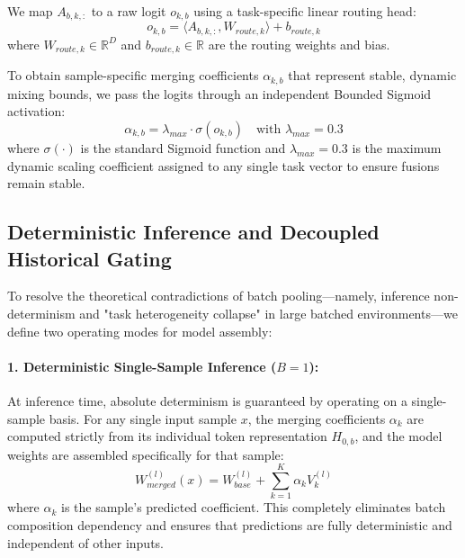 We map $A_{b, k, :}$ to a raw logit $o_{k, b}$ using a task-specific linear routing head:
\begin{equation}
    o_{k, b} = \langle A_{b, k, :}, W_{route, k} \rangle + b_{route, k}
\end{equation}
where $W_{route, k} \in \mathbb{R}^D$ and $b_{route, k} \in \mathbb{R}$ are the routing weights and bias.

To obtain sample-specific merging coefficients $\alpha_{k, b}$ that represent stable, dynamic mixing bounds, we pass the logits through an independent Bounded Sigmoid activation:
\begin{equation}
    \alpha_{k, b} = \lambda_{max} \cdot \sigma(o_{k, b}) \quad \text{with } \lambda_{max} = 0.3
\end{equation}
where $\sigma(\cdot)$ is the standard Sigmoid function and $\lambda_{max} = 0.3$ is the maximum dynamic scaling coefficient assigned to any single task vector to ensure fusions remain stable.

\subsection{Deterministic Inference and Decoupled Historical Gating}
To resolve the theoretical contradictions of batch pooling—namely, inference non-determinism and "task heterogeneity collapse" in large batched environments—we define two operating modes for model assembly:

\paragraph{1. Deterministic Single-Sample Inference ($B=1$):} At inference time, absolute determinism is guaranteed by operating on a single-sample basis. For any single input sample $x$, the merging coefficients $\alpha_{k}$ are computed strictly from its individual token representation $H_{0, b}$, and the model weights are assembled specifically for that sample:
\begin{equation}
    W_{merged}^{(l)}(x) = W_{base}^{(l)} + \sum_{k=1}^K \alpha_{k} V_k^{(l)}
\end{equation}
where $\alpha_k$ is the sample's predicted coefficient. This completely eliminates batch composition dependency and ensures that predictions are fully deterministic and independent of other inputs.

